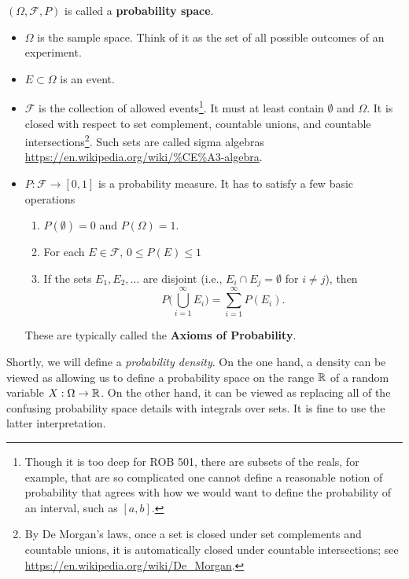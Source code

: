 \begin{definition}
\label{def:ProbSpaceCopy2}
 $(\Omega, \mathscr{F}, P)$ is called a \textbf{probability space}.
\begin{itemize}
\item $\Omega$ is the sample space. Think of it as the set of all possible outcomes of an experiment. 
\item $E \subset \Omega$ is an event.
\item $\mathscr{F}$ is the collection of allowed events\footnote{Though it is too deep for ROB 501, there are subsets of the reals, for example, that are so complicated one cannot define a reasonable notion of probability that agrees with how we would want to define the probability of an interval, such as $[a, b]$.}. It must at least contain $\emptyset$ and $\Omega$. It is closed with respect to set complement, countable unions, and countable intersections\footnote{By De Morgan's laws, once a set is closed under set complements and countable unions, it is automatically closed under countable intersections; see \url{https://en.wikipedia.org/wiki/De_Morgan}.}. Such sets are called sigma algebras \url{https://en.wikipedia.org/wiki/%CE%A3-algebra}.
    \item $P:\mathscr{F} \to [0, 1]$ is a probability measure. It has to satisfy a few basic operations
    \begin{enumerate}
    \item $P(\emptyset)=0$ and $P(\Omega)=1$.
    \item For each $E\in \mathscr{F}$, $0 \le P(E) \le 1$
    \item If the sets $E_1, E_2, \ldots $ are disjoint (i.e., $E_i \cap E_j = \emptyset$ for $i \neq j$), then
    $$P\big(\bigcup_{i=1}^{\infty}E_i\big) = \sum_{i=1}^{\infty} P(E_i). $$
    \end{enumerate}
    These are typically called the \textbf{Axioms of Probability}.
\end{itemize}
\end{definition}

Shortly, we will define a \emph{probability density}. On the one hand, a density can be viewed as allowing us to define a probability space on the range $\mathbb R$ of a random variable $X:\Omega \to \mathbb R$. On the other hand, it can be viewed as replacing all of the confusing probability space details with integrals over sets. It is fine to use the latter interpretation.

